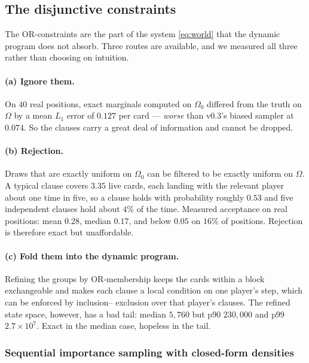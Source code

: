 \documentclass[11pt,letterpaper]{article}
\begin{document}
\subsection{The disjunctive constraints}
\label{sec:clauses}

The OR-constraints are the part of the system \eqref{eq:world} that the
dynamic program does not absorb. Three routes are available, and we measured
all three rather than choosing on intuition.

\paragraph{(a) Ignore them.} On $40$ real positions, exact marginals computed
on $\Omega_0$ differed from the truth on $\Omega$ by a mean $L_1$ error of
$0.127$ per card --- \emph{worse} than v0.3's biased sampler at $0.074$. So the
clauses carry a great deal of information and cannot be dropped.

\paragraph{(b) Rejection.} Draws that are exactly uniform on $\Omega_0$ can be
filtered to be exactly uniform on $\Omega$. A typical clause covers $3.35$ live
cards, each landing with the relevant player about one time in five, so a
clause holds with probability roughly $0.53$ and five independent clauses hold
about $4\%$ of the time. Measured acceptance on real positions: mean $0.28$,
median $0.17$, and below $0.05$ on $16\%$ of positions. Rejection is therefore
exact but unaffordable.

\paragraph{(c) Fold them into the dynamic program.} Refining the groups by
OR-membership keeps the cards within a block exchangeable and makes each clause
a local condition on one player's step, which can be enforced by inclusion--
exclusion over that player's clauses. The refined state space, however, has a
bad tail: median $5{,}760$ but p90 $230{,}000$ and p99 $2.7\times10^{7}$. Exact
in the median case, hopeless in the tail.

\subsubsection{Sequential importance sampling with closed-form densities}
\end{document}
